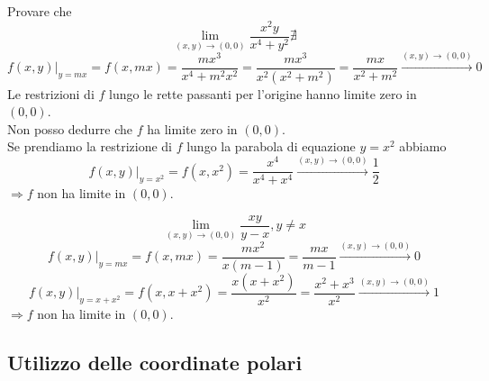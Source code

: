 \begin{exbar}
\begin{example}
	Provare che 
	\begin{equation*}
		\lim_{(x,y)\rightarrow(0,0)}\frac{x^2y}{x^4+y^2} \nexists
	\end{equation*}
	\begin{equation*}
		f(x,y)|_{y=mx}=f(x,mx)=\frac{mx^3}{x^4+m^2x^2}=\frac{mx^3}{x^2(x^2+m^2)}=\frac{mx}{x^2+m^2}\xrightarrow{(x,y)\rightarrow(0,0)}0
	\end{equation*}
	Le restrizioni di $f$ lungo le rette passanti per l'origine hanno limite zero in $(0,0)$.\\
	Non posso dedurre che $f$ ha limite zero in $(0,0)$.\\
	Se prendiamo la restrizione di $f$ lungo la parabola di equazione $y=x^2$ abbiamo
	\begin{equation*}
		f(x,y)|_{y=x^2}=f(x,x^2)=\frac{x^4}{x^4+x^4}\xrightarrow{(x,y)\rightarrow(0,0)} \frac{1}{2}
	\end{equation*}
	$\Rightarrow f$ non ha limite in $(0,0)$.
\end{example}
\end{exbar}


\begin{exbar}
\begin{example}
	\begin{equation*}
		\lim_{(x,y)\rightarrow(0,0)} \frac{xy}{y-x}, y \neq x
	\end{equation*}
	\begin{equation*}
		f(x,y)|_{y=mx}=f(x,mx)=\frac{mx^2}{x(m-1)}=\frac{mx}{m-1}\xrightarrow{(x,y)\rightarrow(0,0)}0
	\end{equation*}
	\begin{equation*}
		f(x,y)|_{y=x+x^2}=f(x,x+x^2)= \frac{x(x+x^2)}{x^2}=\frac{x^2+x^3}{x^2}\xrightarrow{(x,y)\rightarrow(0,0)}1
	\end{equation*}
	$\Rightarrow f$ non ha limite in $(0,0)$.
\end{example}
\end{exbar}


\subsection{Utilizzo delle coordinate polari}

